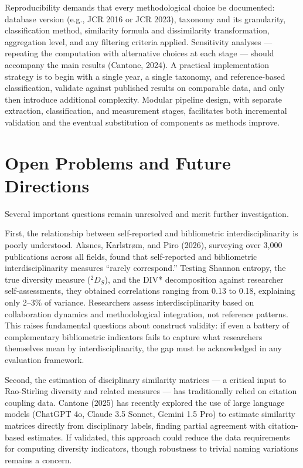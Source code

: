\documentclass[
]{article}
\begin{document}
Reproducibility demands that every methodological choice be documented:
database version (e.g., JCR 2016 or JCR 2023), taxonomy and its
granularity, classification method, similarity formula and dissimilarity
transformation, aggregation level, and any filtering criteria applied.
Sensitivity analyses --- repeating the computation with alternative
choices at each stage --- should accompany the main results (Cantone,
2024). A practical implementation strategy is to begin with a single
year, a single taxonomy, and reference-based classification, validate
against published results on comparable data, and only then introduce
additional complexity. Modular pipeline design, with separate
extraction, classification, and measurement stages, facilitates both
incremental validation and the eventual substitution of components as
methods improve.

\hypertarget{open-problems-and-future-directions}{%
\section{Open Problems and Future
Directions}\label{open-problems-and-future-directions}}

Several important questions remain unresolved and merit further
investigation.

First, the relationship between self-reported and bibliometric
interdisciplinarity is poorly understood. Aksnes, Karlstrøm, and Piro
(2026), surveying over 3,000 publications across all fields, found that
self-reported and bibliometric interdisciplinarity measures ``rarely
correspond.'' Testing Shannon entropy, the true diversity measure
(\(^2D_S\)), and the DIV* decomposition against researcher
self-assessments, they obtained correlations ranging from 0.13 to 0.18,
explaining only 2--3\% of variance. Researchers assess
interdisciplinarity based on collaboration dynamics and methodological
integration, not reference patterns. This raises fundamental questions
about construct validity: if even a battery of complementary
bibliometric indicators fails to capture what researchers themselves
mean by interdisciplinarity, the gap must be acknowledged in any
evaluation framework.

Second, the estimation of disciplinary similarity matrices --- a
critical input to Rao-Stirling diversity and related measures --- has
traditionally relied on citation coupling data. Cantone (2025) has
recently explored the use of large language models (ChatGPT 4o, Claude
3.5 Sonnet, Gemini 1.5 Pro) to estimate similarity matrices directly
from disciplinary labels, finding partial agreement with citation-based
estimates. If validated, this approach could reduce the data
requirements for computing diversity indicators, though robustness to
trivial naming variations remains a concern.
\end{document}
